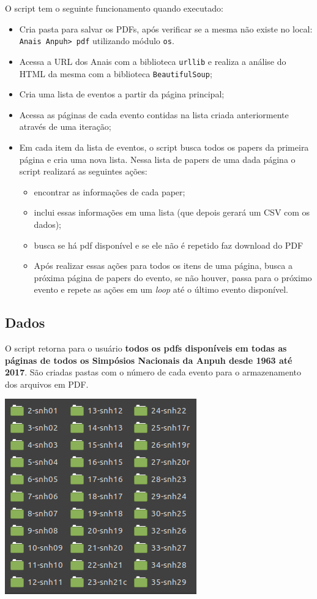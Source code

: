 \documentclass[
]{book}
\providecommand{\tightlist}{%
  \setlength{\itemsep}{0pt}\setlength{\parskip}{0pt}}
\begin{document}
O script tem o seguinte funcionamento quando executado:

\begin{itemize}
\tightlist
\item
  Cria pasta para salvar os PDFs, após verificar se a mesma não existe no local: \texttt{Anais\ Anpuh\textgreater{}\ pdf} utilizando módulo \texttt{os}.
\item
  Acessa a URL dos Anais com a biblioteca \texttt{urllib} e realiza a análise do HTML da mesma com a biblioteca \texttt{BeautifulSoup};
\item
  Cria uma lista de eventos a partir da página principal;
\item
  Acessa as páginas de cada evento contidas na lista criada anteriormente através de uma iteração;
\item
  Em cada item da lista de eventos, o script busca todos os papers da primeira página e cria uma nova lista. Nessa lista de papers de uma dada página o script realizará as seguintes ações:

  \begin{itemize}
  \tightlist
  \item
    encontrar as informações de cada paper;
  \item
    inclui essas informações em uma lista (que depois gerará um CSV com os dados);
  \item
    busca se há pdf disponível e se ele não é repetido faz download do PDF
  \item
    Após realizar essas ações para todos os itens de uma página, busca a próxima página de papers do evento, se não houver, passa para o próximo evento e repete as ações em um \emph{loop} até o último evento disponível.
  \end{itemize}
\end{itemize}

\hypertarget{dados}{%
\subsection{Dados}\label{dados}}

O script retorna para o usuário \textbf{todos os pdfs disponíveis em todas as páginas de todos os Simpósios Nacionais da Anpuh desde 1963 até 2017}. São criadas pastas com o número de cada evento para o armazenamento dos arquivos em PDF.

\includegraphics{img/pastas.png}
\end{document}
